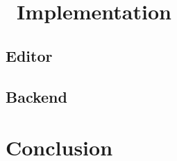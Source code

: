 

\part{\ Implementation}
\label{part:implementation}

\chapter{Editor}
\label{ch:impl-editor}








% 




\chapter{Backend}
\label{ch:impl-backend}






\part{Conclusion}
\label{part:conclusion}

